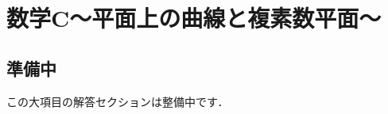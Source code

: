 \documentclass[../../uem_mat_std_a.tex]{subfiles}
\begin{document}
\section{数学C～平面上の曲線と複素数平面～}

\subsection*{準備中}
この大項目の解答セクションは整備中です．
\end{document}
